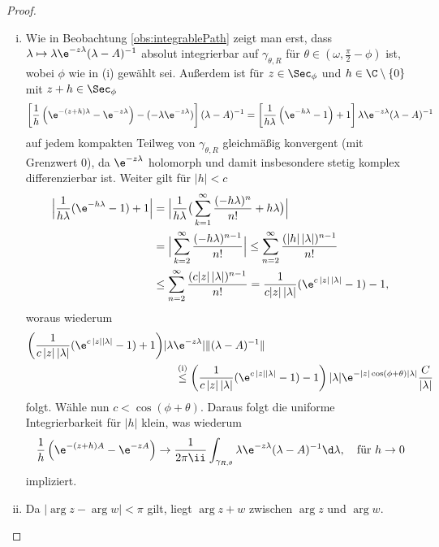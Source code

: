 \begin{proof}
\begin{enumerate}[(i)]
    \item Wie in Beobachtung \ref{obs:integrablePath} zeigt man erst, dass $\lambda \mapsto \lambda \e^{-z\lambda}(\lambda - A)^{-1}$ absolut integrierbar auf $\gamma_{\theta,R}$ für $\theta \in (\omega, \frac{\pi}{2} - \phi)$ ist, wobei $\phi$ wie in (i) gewählt sei.
      Außerdem ist für $z \in \Sec_\phi$ und $h \in \C\setminus\{0\}$ mit $z + h \in \Sec_\phi$ 
      $$
      \left[ \frac{1}{h} \left( \e^{-(z + h)\lambda} - \e^{-z\lambda} \right) - (- \lambda \e^{-z\lambda}) \right] (\lambda - A)^{-1}
      = \left[ \frac{1}{h\lambda} \left( \e^{-h\lambda} - 1\right) + 1\right] \lambda \e^{-z\lambda}  (\lambda - A)^{-1}
      $$
      auf jedem kompakten Teilweg von $\gamma_{\theta,R}$ gleichmäßig konvergent (mit Grenzwert 0), da $\e^{-z\lambda}$ holomorph und damit insbesondere stetig komplex differenzierbar ist.
      Weiter gilt für $|h| < c$
      \begin{align*}
        \Big| \frac{1}{h\lambda} (\e^{-h\lambda} - 1) + 1 \Big|
        &= \Big| \frac{1}{h\lambda} \big(\sum_{k = 1}^\infty \frac{(-h\lambda)^{n}}{n!} + h\lambda \big) \Big| \\
        &= \Big| \sum_{k = 2}^\infty \frac{(-h \lambda)^{n - 1}}{n!} \Big|
        \leq \sum_{n = 2}^\infty \frac{(|h| \, |\lambda|)^{n - 1}}{n!} \\
        &\leq \sum_{n = 2}^\infty \frac{(c |z| \, |\lambda|)^{n - 1}}{n!}
        = \frac{1}{c|z|\, |\lambda|} (\e^{c\,|z|\,|\lambda|} - 1) - 1,
      \end{align*}
      woraus wiederum
      \begin{align*}
        \left( \frac{1}{c\, |z|\, |\lambda|} (\e^{c\, |z| |\lambda|} - 1) + 1 \right) & | \lambda \e^{-z\lambda} | \| (\lambda - A)^{-1} \| \\
        &\quad\overset{\mathrm{(i)}}{\leq} \left( \frac{1}{c\, |z|\, |\lambda|} (\e^{c\, |z| |\lambda|} - 1) - 1 \right) | \lambda| \e^{-|z|\cos(\phi + \theta) |\lambda|} \frac{C}{|\lambda|}
      \end{align*}
      folgt.
      Wähle nun $c < \cos(\phi + \theta)$.
      Daraus folgt die uniforme Integrierbarkeit für $|h|$ klein, was wiederum
      $$
      \frac{1}{h} \left(\e^{-(z + h)A} - \e^{-zA} \right) \to 
      \frac{1}{2\pi \ii} \int_{\gamma_{R, \theta}} \lambda \e^{-z\lambda}(\lambda - A)^{-1} \d \lambda, \quad\text{für } h \to 0
      $$
      impliziert.

    \item 
      Da $|\arg z  - \arg w | < \pi$ gilt, liegt $\arg z + w$ zwischen $\arg z$ und $\arg w$.
      

\end{enumerate}
\end{proof}
